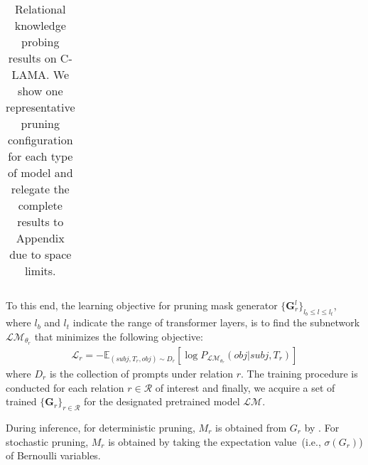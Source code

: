\begin{table*}[!t]
\begin{tabular}{l|ccc|c|c|c}
		\bottomrule
	\end{tabular}
	\caption{Relational knowledge probing results on C-LAMA. We show one representative 
pruning configuration for each type of model and relegate the 
complete results to Appendix due to space limits.}
	\label{table:rank}
\end{table*}
To this end, the learning objective for pruning mask generator 
$\{\bm{G}_r^l\}_{l_b \leq l \leq l_t}$, where $l_b$ and $l_t$ indicate 
the range of transformer layers, is to find the subnetwork 
$\mathcal{LM}_{\theta_r}$ that minimizes the following objective:
\begin{align}\nonumber
	\mathcal{L}_r=-\mathbb{E}_{(subj, T_r, obj)\sim D_r}[\log{P_{\mathcal{LM}_{\theta_r}}(obj|subj, T_r)}]
	\label{eq:objective}
\end{align}
where $D_r$ is the collection of prompts under relation $r$. The training procedure is conducted for each relation $r\in \mathcal{R}$ of interest and finally, we acquire a set of trained $\{\bm{G}_r\}_{r\in \mathcal{R}}$ for the designated pretrained model $\mathcal{LM}$.

During inference, for deterministic pruning, $M_r$ is obtained from $G_r$ by . For stochastic pruning, $M_r$ is obtained by taking the expectation value~(i.e., $\sigma(G_r)$) of Bernoulli variables.
